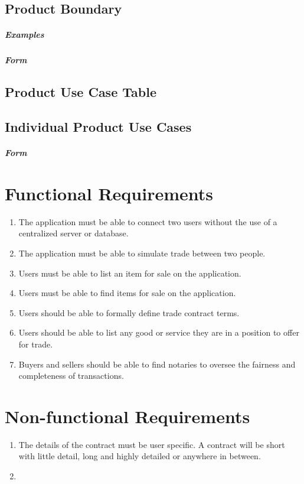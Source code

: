 \documentclass{article}
\begin{document}
\subsection{Product Boundary}
\subparagraph{Examples}
\subparagraph{Form}

\subsection{Product Use Case Table}

\subsection{Individual Product Use Cases}
\subparagraph{Form}

\section*{Functional Requirements}
\begin{enumerate}
\item
The application must be able to connect two users without the use of a centralized server or database.
\item
The application must be able to simulate trade between two people.
\item
Users must be able to list an item for sale on the application.
\item
Users must be able to find items for sale on the application.
\item
Users should be able to formally define trade contract terms.
\item
Users should be able to list any good or service they are in a position to offer for trade.
\item
Buyers and sellers should be able to find notaries to oversee the fairness and completeness of transactions.
\end{enumerate}

\section*{Non-functional Requirements}
\begin{enumerate}
\item
The details of the contract must be user specific. A contract will be short with little detail, long and highly detailed or anywhere in between.

\item

\end{enumerate}
\end{document}
